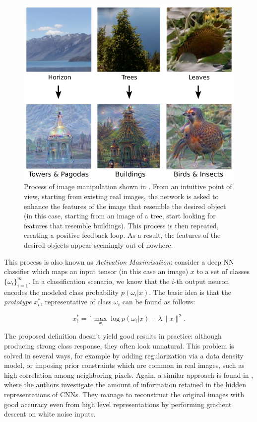 \begin{figure}[h]
	\centering
	\includegraphics[width=0.6\linewidth]{figures/image-dream-map.png}
	\caption{Process of image manipulation shown in \cite{mordvintsev2015inceptionism}. From an intuitive point of view, starting from existing real images, the network is asked to enhance the features of the image that resemble the desired object (in this case, starting from an image of a tree, start looking for features that resemble buildings). This process is then repeated, creating a positive feedback loop. As a result, the features of the desired objects appear seemingly out of nowhere.}
	\label{fig:image_dream_map}
\end{figure}

This process is also known as \textit{Activation Maximization}: consider a deep NN classifier which maps an input tensor (in this case an image) $x$ to a set of classes $\{\omega_i\}_{i=1}^m$. In a classification scenario, we know that the $i$-th output neuron encodes the modeled class probability $p\left(\omega_i|x\right)$. The basic idea is that the \textit{prototype} $x_i^*$, representative of class $\omega_i$ can be found as follows:

$$x_i^* = ´\max_x \log p(\omega_i|x) - \lambda \|x\|^2.$$

The proposed definition doesn't yield good results in practice: although producing strong class response, they often look unnatural. This problem is solved in several ways, for example by adding regularization via a data density model, or imposing prior constraints which are common in real images, such as high correlation among neighboring pixels. Again, a similar approach is found in \cite{mahendran2014understanding}, where the authors investigate the amount of information retained in the hidden representations of CNNs. They manage to reconstruct the original images with good accuracy even from high level representations by performing gradient descent on white noise inputs.

